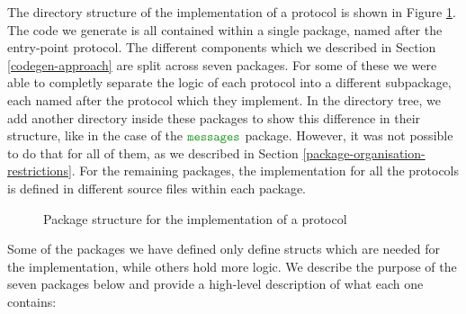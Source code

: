 \documentclass[12pt,twoside]{report}
\begin{document}

The directory structure of the implementation of a protocol is shown in Figure \ref{project-package-structure}. The code we generate is all contained within a single package, named after the entry-point protocol. The different components which we described in Section \ref{codegen-approach} are split across seven packages. For some of these we were able to completly separate the logic of each protocol into a different subpackage, each named after the protocol which they implement. In the directory tree, we add another directory inside these packages to show this difference in their structure, like in the case of the $\pkgname{messages}$ package. However, it was not possible to do that for all of them, as we described in Section \ref{package-organisation-restrictions}. For the remaining packages, the implementation for all the protocols is defined in different source files within each package.\\

\begin{figure}[h!]
    \centering
    \begin{minipage}{5cm}
    \end{minipage}
    \caption{Package structure for the implementation of a protocol}
    \label{project-package-structure}
\end{figure}

Some of the packages we have defined only define structs which are needed for the implementation, while others hold more logic. We describe the purpose of the seven packages below and provide a high-level description of what each one contains:
\end{document}
